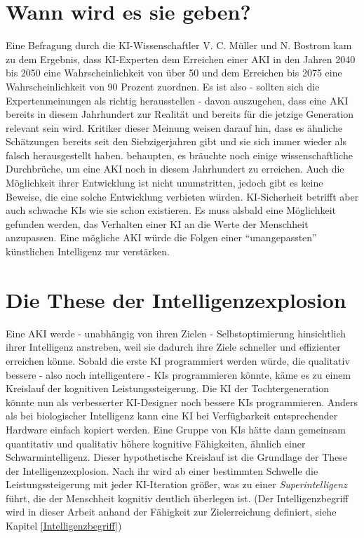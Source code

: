 \section{Wann wird es sie geben?}
Eine Befragung durch die KI-Wissenschaftler V. C. Müller und N. Bostrom kam zu dem Ergebnis, dass KI-Experten dem Erreichen einer AKI in den Jahren 2040 bis 2050 eine Wahrscheinlichkeit von über 50 und dem Erreichen bis 2075 eine Wahrscheinlichkeit von 90 Prozent zuordnen.  Es ist also - sollten sich die Expertenmeinungen als richtig herausstellen - davon auszugehen, dass eine AKI bereits in diesem Jahrhundert zur Realität und bereits für die jetzige Generation relevant sein wird. Kritiker dieser Meinung weisen darauf hin, dass es ähnliche Schätzungen bereits seit den Siebzigerjahren gibt und sie sich immer wieder als falsch herausgestellt haben. \citeauthor{allen_paul_2011} behaupten, es bräuchte noch einige wissenschaftliche Durchbrüche, um eine AKI noch in diesem Jahrhundert zu erreichen.  Auch die Möglichkeit ihrer Entwicklung ist nicht unumstritten, jedoch gibt es keine Beweise, die eine solche Entwicklung verbieten würden. KI-Sicherheit betrifft aber auch schwache KIs wie sie schon existieren. Es muss alsbald eine Möglichkeit gefunden werden, das Verhalten einer KI an die Werte der Menschheit anzupassen. Eine mögliche AKI würde die Folgen einer \enquote{unangepassten} künstlichen Intelligenz nur verstärken.

\section{Die These der Intelligenzexplosion}
Eine AKI werde - unabhängig von ihren Zielen - Selbstoptimierung hinsichtlich ihrer Intelligenz anstreben, weil sie dadurch ihre Ziele schneller und effizienter erreichen könne. Sobald die erste KI programmiert werden würde, die qualitativ bessere - also noch intelligentere - KIs programmieren könnte, käme es zu einem Kreislauf der kognitiven Leistungssteigerung. Die KI der Tochtergeneration könnte nun als verbesserter KI-Designer noch bessere KIs programmieren. Anders als bei biologischer Intelligenz kann eine KI bei Verfügbarkeit entsprechender Hardware einfach kopiert werden. Eine Gruppe von KIs hätte dann gemeinsam quantitativ und qualitativ höhere kognitive Fähigkeiten, ähnlich einer Schwarmintelligenz. Dieser hypothetische Kreislauf ist die Grundlage der These der Intelligenzexplosion. Nach ihr wird ab einer bestimmten Schwelle die Leistungssteigerung mit jeder KI-Iteration größer, was zu einer \emph{Superintelligenz} führt, die der Menschheit kognitiv deutlich überlegen ist. (Der Intelligenzbegriff wird in dieser Arbeit anhand der Fähigkeit zur Zielerreichung definiert, siehe Kapitel \ref{Intelligenzbegriff}) 

